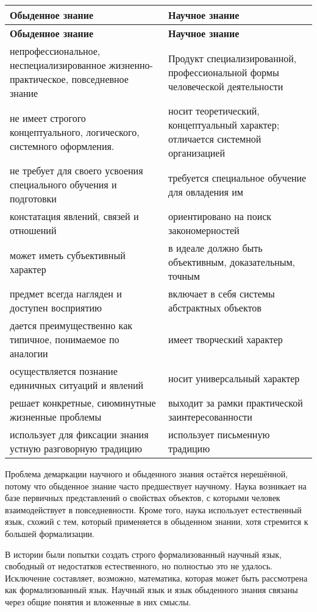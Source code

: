 \begin{longtable}{|>{\raggedright\arraybackslash}p{7cm}|>{\raggedright\arraybackslash}p{7cm}|}
\hline
\textbf{Обыденное знание} & \textbf{Научное знание} \\
\hline
\endfirsthead

\hline
\textbf{Обыденное знание} & \textbf{Научное знание} \\
\hline
\endhead

непрофессиональное, неспециализированное жизненно-практическое, повседневное знание & Продукт специализированной, профессиональной формы человеческой деятельности \\
\hline
не имеет строгого концептуального, логического, системного оформления. & носит теоретический, концептуальный характер; отличается системной организацией \\
\hline
не требует для своего усвоения специального обучения и подготовки & требуется специальное обучение для овладения им\\
\hline
констатация явлений, связей и отношений & ориентировано на поиск закономерностей \\
\hline
может иметь субъективный характер & в идеале должно быть объективным, доказательным, точным \\
\hline
предмет всегда нагляден и доступен восприятию & включает в себя системы абстрактных объектов \\
\hline
дается преимущественно как типичное, понимаемое по аналогии & имеет творческий характер\\
\hline
осуществляется познание единичных ситуаций и явлений & носит универсальный характер \\
\hline
решает конкретные, сиюминутные жизненные проблемы & выходит за рамки практической заинтересованности \\
\hline
использует для фиксации знания устную разговорную традицию &  использует письменную традицию \\
\hline
\end{longtable}


Проблема демаркации научного и обыденного знания остаётся нерешённой, потому что обыденное знание часто предшествует научному. Наука возникает на базе первичных представлений о свойствах объектов, с которыми человек взаимодействует в повседневности. Кроме того, наука использует естественный язык, схожий с тем, который применяется в обыденном знании, хотя стремится к большей формализации. 

В истории были попытки создать строго формализованный научный язык, свободный от недостатков естественного, но полностью это не удалось. Исключение составляет, возможно, математика, которая может быть рассмотрена как формализованный язык. Научный язык и язык обыденного знания связаны через общие понятия и вложенные в них смыслы.



